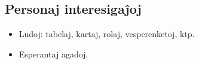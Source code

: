 \documentclass[12pt,a4paper]{article}
\newenvironment{itemcvsection}[1]%
               {\subsection*{#1}\begin{itemize}}
               {\end{itemize}}
\begin{document}
\begin{itemcvsection}{Personaj interesigaĵoj}

  \item Ludoj: tabelaj, kartaj, rolaj, vesperenketoj, ktp.
  \item Esperantaj agadoj.

\end{itemcvsection}
\end{document}

